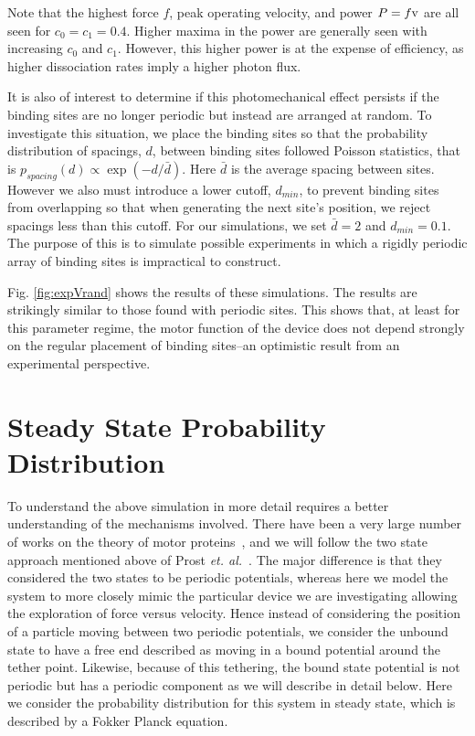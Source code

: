 \documentclass[11pt]{ucthesis}
\begin{document}
Note that the highest force $f$, peak operating velocity, and power $P=f{\rm v}$ are all seen for $c_0 = c_1 = 0.4$. Higher maxima in the power are generally seen with increasing $c_0$ and $c_1$. However, this higher power is at the expense of efficiency, as higher
dissociation rates imply a higher photon flux.

It is also of interest to determine if this photomechanical effect persists if the binding sites are no longer periodic but instead are arranged at random. To investigate this situation, we place the binding sites so that the probability distribution of spacings, $d$, between binding sites followed Poisson statistics, that is $p_{spacing}(d) \propto \exp(-d/{\bar d})$. Here ${\bar d}$ is the average spacing between sites. However we also must introduce a lower cutoff, $d_{min}$, to prevent binding sites from overlapping so that when generating the next site's position, we reject spacings less than this cutoff. For our simulations, we set $\bar d = 2$ and $d_{min} = 0.1$. The purpose of this is to simulate possible experiments in which a rigidly periodic array of binding sites is impractical to construct.

Fig. \ref{fig:expVrand} shows the results of these simulations. The results are strikingly similar to those found with periodic sites. This shows that, at least for this parameter regime, the motor function of the device does not depend strongly on the regular placement of binding sites--an optimistic result from an experimental perspective.


\section{Steady State Probability Distribution}
\label{sec:SSPD}
To understand the above simulation in more detail requires a
better understanding of the mechanisms involved. There have been a very large
number of works on the theory of motor proteins~\cite{ReimannRev,BustamanteKellerOster}, and we will follow the two
state approach mentioned above of Prost {\em et. al.}~\cite{ProstPRL,JulicherRevModPhys}. 
The major difference is that they considered the two states to be periodic
potentials, whereas here we model the system to more closely mimic the
particular device we are investigating allowing the exploration
of force versus velocity. Hence instead of considering the
position of a particle moving between two periodic potentials, we consider
the unbound state to have a free end described as moving in a bound
potential around the tether point. Likewise, because of this tethering, the
bound state potential is not periodic but has a periodic component as we
will describe in detail below.
Here we consider the probability distribution for this system in steady
state, which is described by a Fokker Planck equation.
\end{document}
